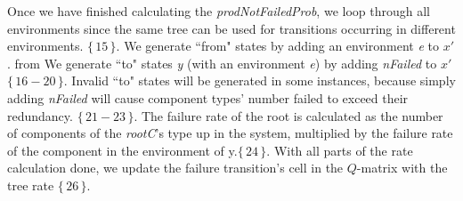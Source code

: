 \documentclass[12pt]{article}
\newcommand{\varName}[1]{\textrm{\it#1}}
\newcommand{\citeLine}[1]{$\{\,#1\,\}$}
\newcommand{\citeBlock}[2]{$\{\,#1 - #2\,\}$}
\begin{document}
Once we have finished calculating the \textit{prodNotFailedProb}, we loop through all environments since the same tree can be used for transitions occurring in different environments. \citeLine{15}. We generate ``from" states by adding an environment \textit{e} to $x'$. from We generate ``to" states \textit{y} (with an environment \textit{e}) by adding \textit{nFailed} to $x'$ \citeBlock{16}{20}. Invalid ``to" states will be generated in some instances, because simply adding \textit{nFailed} will cause component types' number failed to exceed their redundancy. \citeBlock{21}{23}. The failure rate of the root is calculated as the number of components of the \varName{rootC}'s type up in the system, multiplied by the failure rate of the component in the environment of y.\citeLine{24}. With all parts of the rate calculation done, we update the failure transition's cell in the $Q$-matrix with the tree rate \citeLine{26}.
\end{document}

